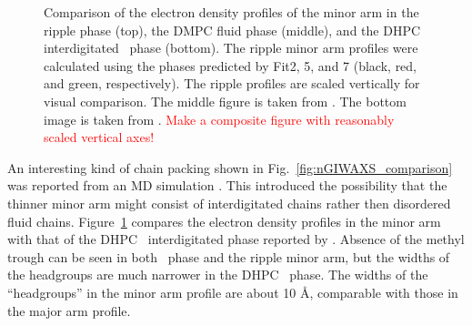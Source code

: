 \begin{figure}[htbp]
  \caption{Comparison of the electron density profiles of 
  the minor arm in the ripple phase (top),  
  the DMPC fluid phase (middle), and
  the DHPC interdigitated \LI\ phase (bottom). 
  The ripple minor arm profiles were calculated 
  using the phases predicted by Fit2, 5, and 7 (black, red, and green, respectively). 
  The ripple profiles are scaled vertically for visual comparison.    
  The middle figure is taken from \cite{Kucerka05_BPJ}. 
  The bottom image is taken from \cite{ref:Guler09}.
  \textcolor{red}{Make a composite figure with reasonably scaled vertical axes!}
  }
  \label{fig:minor_comparison}
\end{figure}


An interesting kind of chain packing shown in Fig.~\ref{fig:nGIWAXS_comparison} 
was reported from an MD simulation \cite{ref:deVries05}. This introduced the 
possibility that the thinner minor arm might consist of interdigitated chains 
rather then disordered fluid chains.  
Figure~\ref{fig:minor_comparison} compares the electron density
profiles in the minor arm with that of the DHPC \LI\ interdigitated phase
reported by \cite{ref:Guler09}. Absence of the methyl trough can be seen in
both \LI\ phase and the ripple minor arm, but the widths of the
headgroups are much narrower in the DHPC \LI\ phase. The widths
of the ``headgroups'' in the minor arm profile are about 10 \AA, comparable
with those in the major arm profile.


